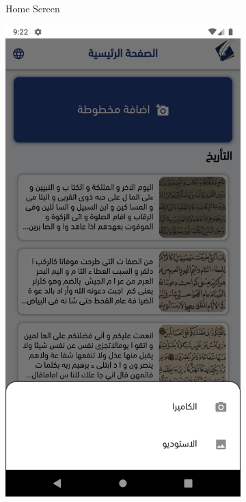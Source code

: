 \begin{figure}[H]
\begin{subfigure}[b]{0.3\textwidth}
         \caption{Home Screen}
         \label{fig:mobile-home-screen}
     \end{subfigure}
     \hfill%
      \begin{subfigure}[b]{0.3\textwidth}
         \centering
         \includegraphics[width=\textwidth]{images/app/mobile/mobile-3.png}

\end{subfigure}
\end{figure}
